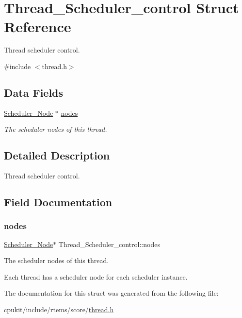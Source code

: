 \hypertarget{structThread__Scheduler__control}{}\section{Thread\+\_\+\+Scheduler\+\_\+control Struct Reference}
\label{structThread__Scheduler__control}


Thread scheduler control.  




{\ttfamily \#include $<$thread.\+h$>$}

\subsection*{Data Fields}
\begin{DoxyCompactItemize}
\item 
\mbox{\hyperlink{structScheduler__Node}{Scheduler\+\_\+\+Node}} $\ast$ \mbox{\hyperlink{structThread__Scheduler__control_a8a92ab798b4a0b59ed19584902ee8a41}{nodes}}
\begin{DoxyCompactList}\small\item\em The scheduler nodes of this thread. \end{DoxyCompactList}\end{DoxyCompactItemize}


\subsection{Detailed Description}
Thread scheduler control. 

\subsection{Field Documentation}
\mbox{\label{structThread__Scheduler__control_a8a92ab798b4a0b59ed19584902ee8a41}} 
\subsubsection{\texorpdfstring{nodes}{nodes}}
{\footnotesize\ttfamily \mbox{\hyperlink{structScheduler__Node}{Scheduler\+\_\+\+Node}}$\ast$ Thread\+\_\+\+Scheduler\+\_\+control\+::nodes}



The scheduler nodes of this thread. 

Each thread has a scheduler node for each scheduler instance. 

The documentation for this struct was generated from the following file\+:\begin{DoxyCompactItemize}
\item 
cpukit/include/rtems/score/\mbox{\hyperlink{score_2thread_8h}{thread.\+h}}\end{DoxyCompactItemize}
